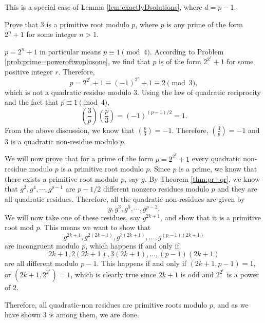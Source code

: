 \documentclass{subfile}
\begin{document}
	\begin{solution}[2]
		This is a special case of Lemma \ref{lem:exactlyDsolutions}, where $d=p-1$.
	\end{solution}
	
	\begin{problem}
		Prove that $3$ is a primitive root modulo $p$, where $p$ is any prime of the form $2^n+1$ for some integer $n>1$.
	\end{problem}
	
	\begin{solution}[1]
		$p=2^n+1$ in particular means $p \equiv 1 \pmod{4}$.
		According to Problem \ref{prob:prime=poweroftwoplusone}, we find that $p$ is of the form $2^{2^r} + 1$ for some positive integer $r$. Therefore, $$p = 2^{2^{r}} +1 \equiv (-1)^{2^r} +1 \equiv 2 \pmod{3},$$ which is not a quadratic residue modulo $3$.
		Using the law of quadratic reciprocity and the fact that $p \equiv 1 \pmod{4}$, 
		\[\left(\dfrac{3}{p}\right) \left(\dfrac{p}{3}\right) = (-1)^{(p-1)/2} =1.\] From the above discussion, we know that $\left( \frac{p}{3} \right) = -1$. Therefore, $\left(\frac{3}{p}\right)=-1$ and $3$ is a quadratic non-residue modulo $p$.
		
		We will now prove that for a prime of the form $p=2^{2^{r}}+1$ every quadratic non-residue modulo $p$ is a primitive root modulo $p$. Since $p$ is a prime, we know that there exists a primitive root modulo $p$, say $g$. By Theorem \ref{thm:pr+qr}, we know that $g^2,g^4,\cdots,g^{p-1}$ are ${p-1}/{2}$ different nonzero residues modulo $p$ and they are all quadratic residues. Therefore, all the quadratic non-residues are given by $$g,g^3,g^5,\cdots,g^{p-2}.$$
		We will now take one of these residues, say $g^{2k+1}$, and show that it is a primitive root mod ${p}$. This means we want to show that $$g^{2k+1},g^{2(2k+1)},g^{3(2k+1)},\ldots,g^{(p-1)(2k+1)}$$ are incongruent modulo $p$, which  happens if and only if $$2k+1,2(2k+1),3(2k+1),\ldots,(p-1)(2k+1)$$ are all different modulo ${p-1}$. This happens if and only if $(2k+1,p-1)=1$, or $(2k+1,2^{2^r})=1$, which is clearly true since $2k+1$ is odd and $2^{2^{r}}$ is a power of $2$. 
		
		Therefore, all quadratic-non residues are primitive roots modulo $p$, and as we have shown $3$ is among them, we are done.
	\end{solution}
	
\end{document}
